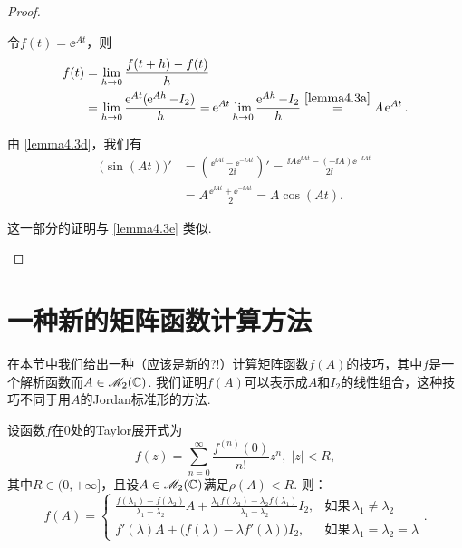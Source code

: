 \begin{proof}
\begin{inparaenum}[(a)]
    \item 令$f(t)=\ee^{At}$，则
    \begin{align*}
      f(t) & = \lim_{h\to0} \frac{f(t+h) - f(t)}h \\
      & = \lim_{h\to0} \frac{\ee^{At}(\ee^{Ah}-I_2)}h =
      \ee^{At}\lim_{h\to0} \frac{\ee^{Ah}-I_2}h
      \overset{\ref{lemma4.3a}}{=} A\ee^{At}.
    \end{align*}

    \item 由 \ref{lemma4.3d}，我们有
    \begin{align*}
      \big(\sin(At)\big)' & = \left( \frac{\ee^{\ii At} - \ee^{-\ii At}}{2\ii} \right)' = \frac{\ii A\ee^{\ii At} - (-\ii A)\ee^{-\ii At}}{2\ii} \\
      & = A\frac{\ee^{\ii At} + \ee^{-\ii At}}2 = A\cos(At).
    \end{align*}

    \item 这一部分的证明与 \ref{lemma4.3e} 类似.
  \end{inparaenum}
\end{proof}

\section{一种新的矩阵函数计算方法}
在本节中我们给出一种（{\kaishu 应该是新的?!}）计算矩阵函数$f(A)$的技巧，其中$f$是一个解析函数而$A\in\mathscr M_2(\mathbb C)$. 我们证明$f(A)$可以表示成$A$和$I_2$的线性组合，这种技巧不同于用$A$的Jordan标准形的方法.

\begin{mybox}
  \begin{theorem}
  设函数$f$在0处的Taylor展开式为
  \[
    f(z) = \sum_{n=0}^\infty \frac{f^{(n)}(0)}{n!}z^n,\; |z|<R,
  \]
  其中$R\in(0,+\infty]$，且设$A\in\mathscr M_2(\mathbb C)$满足$\rho(A)<R$. 则：
  \[
    f(A) = \begin{cases}
      \frac{f(\lambda_1) - f(\lambda_2)}{\lambda_1 - \lambda_2}A + \frac{\lambda_1f(\lambda_2) - \lambda_2f(\lambda_1)}{\lambda_1 - \lambda_2} I_2, & \text{如果}\, \lambda_1\ne \lambda_2 \\
      f'(\lambda)A + \big( f(\lambda) - \lambda f'(\lambda) \big)I_2, & \text{如果}\, \lambda_1 = \lambda_2 = \lambda
    \end{cases}.
  \]
  \end{theorem}
\end{mybox}

